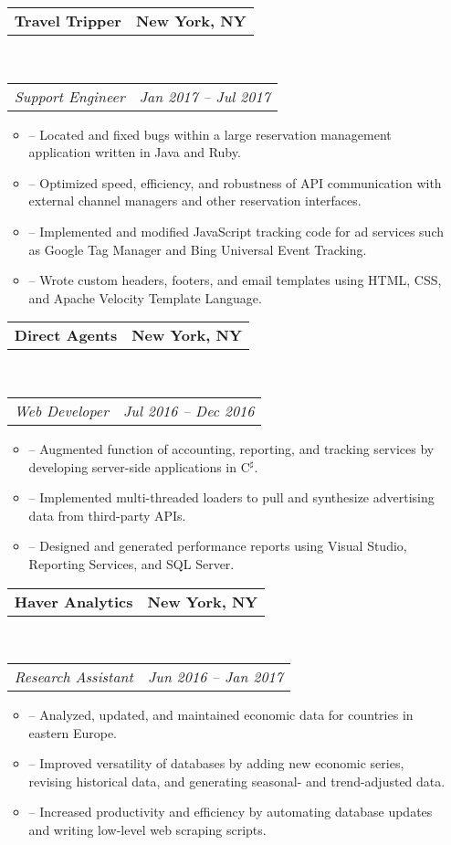 \documentclass[11pt,letterpaper]{article}
\makeatletter
\newenvironment{shortlist}
{\setlength{\linewidth}{0.9\linewidth}
\begin{itemize}
}
{\end{itemize}}
\newcommand{\headerrow}[2]
{\begin{tabular*}{\linewidth}{l@{\extracolsep{\fill}}r}
	#1 &
	#2 \\
\end{tabular*}}
\makeatother
\begin{document}
\begin{itemize}
	\parskip=0.1em

    \item[]
	\headerrow
		{\textbf{Travel Tripper}}
        {\textbf{New York, NY}}
	\\
	\headerrow
		{\emph{Support Engineer}}
		{\emph{Jan 2017 -- Jul 2017}}
    \begin{shortlist}
        \item[--]
        Located and fixed bugs within a large reservation management application written in Java
        and Ruby.

        \item[--]
        Optimized speed, efficiency, and robustness of API communication with external channel
        managers and other reservation interfaces.

        \item[--]
        Implemented and modified JavaScript tracking code for ad services such as Google Tag
        Manager and Bing Universal Event Tracking.

        \item[--]
        Wrote custom headers, footers, and email templates using HTML, CSS, and Apache Velocity
        Template Language.
    \end{shortlist}

    \item[]
	\headerrow
		{\textbf{Direct Agents}}
		{\textbf{New York, NY}}
	\\
	\headerrow
		{\emph{Web Developer}}
		{\emph{Jul 2016 -- Dec 2016}}
	\begin{shortlist}
        \item[--]
        Augmented function of accounting, reporting, and tracking services by developing server-side
        applications in C$^\sharp$.

        \item[--]
        Implemented multi-threaded loaders to pull and synthesize advertising data from third-party
        APIs.

        \item[--]
        Designed and generated performance reports using Visual Studio, Reporting Services, and
        SQL Server.

	\end{shortlist}

    \item[]
	\headerrow
		{\textbf{Haver Analytics}}
		{\textbf{New York, NY}}
	\\
	\headerrow
		{\emph{Research Assistant}}
		{\emph{Jun 2016 -- Jan 2017}}
	\begin{shortlist}
        \item[--]
        Analyzed, updated, and maintained economic data for countries in eastern Europe.
        \item[--]
        Improved versatility of databases by adding new economic series, revising historical data, and
        generating seasonal- and trend-adjusted data.
        \item[--]
        Increased productivity and efficiency by automating database 
        updates and writing low-level web scraping scripts.


\end{shortlist}
\end{itemize}
\end{document}
